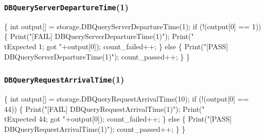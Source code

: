 \documentclass{article}
\def\nwendcode{\endtrivlist \endgroup}
\let\nwdocspar=\par
\begin{document}
\subsubsection{{\tt{}DBQueryServerDepartureTime}(1)}
\nwenddocs{}\endmoddef{}
\{
  int output[] = storage.DBQueryServerDepartureTime(1);
  if (!(output[0] == 1)) \{
    Print("[FAIL] DBQueryServerDepartureTime(1)");
    Print("\\tExpected 1; got "+output[0]);
    count_failed++;
  \} else \{
    Print("[PASS] DBQueryServerDepartureTime(1)");
    count_passed++;
  \}
\}
\nwendcode{}\nwdocspar
\subsubsection{{\tt{}DBQueryRequestArrivalTime}(1)}
\nwenddocs{}\endmoddef{}
\{
  int output[] = storage.DBQueryRequestArrivalTime(10);
  if (!(output[0] == 44)) \{
    Print("[FAIL] DBQueryRequestArrivalTime(1)");
    Print("\\tExpected 44; got "+output[0]);
    count_failed++;
  \} else \{
    Print("[PASS] DBQueryRequestArrivalTime(1)");
    count_passed++;
  \}
\}
\nwendcode{}\nwdocspar
\end{document}
